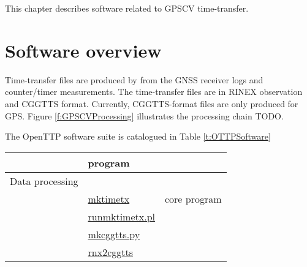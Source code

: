 
This chapter describes software related to GPSCV time-transfer.


\section{Software overview}

Time-transfer files are produced by  from the GNSS receiver logs and counter/timer measurements.
The time-transfer files are in  RINEX observation  and CGGTTS format. 
Currently, CGGTTS-format files are only produced for GPS. 
Figure \ref{f:GPSCVProcessing} illustrates the processing chain TODO. 

The OpenTTP software suite is catalogued in Table \ref{t:OTTPSoftware}
\begin{table}
\begin{tabular}{l|l|l}
	& program & \\ 
	\hline
Data processing  &  & \\
	& \hyperlink{h:mktimetx}{mktimetx} & core program\\
	& \hyperlink{h:runmktimetx}{runmktimetx.pl} & \\
	& \hyperlink{h:mkcggtts}{mkcggtts.py} & \\
	& \hyperlink{h:rnx2cggtts}{rnx2cggtts} & \\
	

\end{tabular}
\end{table}
